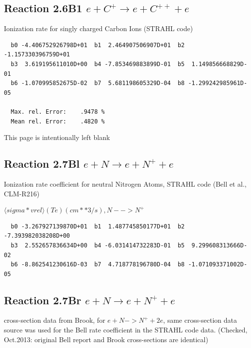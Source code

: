 \documentclass[12pt,dvipdfmx]{article}
\begin{document}
\subsection{
Reaction 2.6B1   $e + C^+ \rightarrow e + C^{++} + e  $
}

  Ionization rate for singly charged Carbon Ions (STRAHL code)


\begin{small}\begin{verbatim}
  b0 -4.406752926798D+01  b1  2.464907506907D+01  b2 -1.157330396759D+01
  b3  3.619195611010D+00  b4 -7.853469883899D-01  b5  1.149856668829D-01
  b6 -1.070995852675D-02  b7  5.681198605329D-04  b8 -1.299242985961D-05

  Max. rel. Error:    .9478 %
  Mean rel. Error:    .4820 %

\end{verbatim}\end{small}
\newpage
This page is intentionally left blank
\newpage



\subsection{
Reaction 2.7Bl   $e + N \rightarrow e + N^+ + e  $
}

  Ionization rate coefficient for neutral Nitrogen Atoms, STRAHL code
  (Bell et al., CLM-R216) \cite{kn:Bell}

  $ \langle sigma*vrel \rangle(Te)  (cm**3/s), N --> N^+$

\begin{small}\begin{verbatim}
  b0 -3.267927139870D+01  b1  1.487745850177D+01  b2 -7.393982038208D+00
  b3  2.552657836634D+00  b4 -6.031414732283D-01  b5  9.299608313666D-02
  b6 -8.862541230616D-03  b7  4.718778196780D-04  b8 -1.071093371002D-05

\end{verbatim}\end{small}

\subsection{
Reaction 2.7Br   $e + N \rightarrow e + N^+ + e  $
}
cross-section data from Brook, \cite{kn:Brook}   for $ e + N -> N^+ + 2e $,
same cross-section data source was used for the Bell rate coefficient in the STRAHL code data.
(Checked, Oct.2013: original Bell report and Brook cross-sections
are identical)
\end{document}
